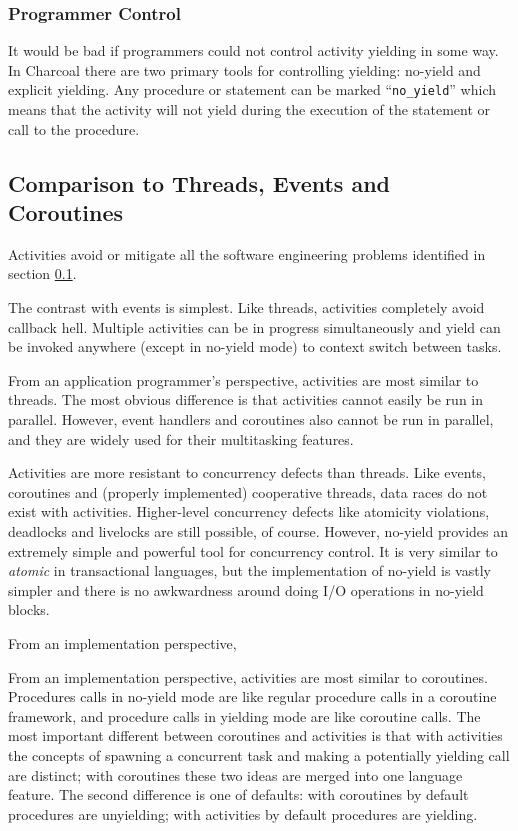 \documentclass[10pt,preprint]{sigplanconf}
\begin{document}
\subsubsection{Programmer Control}

It would be bad if programmers could not control activity yielding in some way.
In Charcoal there are two primary tools for controlling yielding: no-yield and explicit yielding.
Any procedure or statement can be marked ``\texttt{no\_yield}'' which means that the activity will not yield during the execution of the statement or call to the procedure.

\subsection{Comparison to Threads, Events and Coroutines}

Activities avoid or mitigate all the software engineering problems identified in section \ref{}.

The contrast with events is simplest.
Like threads, activities completely avoid callback hell.
Multiple activities can be in progress simultaneously and yield can be invoked anywhere (except in no-yield mode) to context switch between tasks.

From an application programmer's perspective, activities are most similar to threads.
The most obvious difference is that activities cannot easily be run in parallel.
However, event handlers and coroutines also cannot be run in parallel, and they are widely used for their multitasking features.

Activities are more resistant to concurrency defects than threads.
Like events, coroutines and (properly implemented) cooperative threads, data races do not exist with activities.
Higher-level concurrency defects like atomicity violations, deadlocks and livelocks are still possible, of course.
However, no-yield provides an extremely simple and powerful tool for concurrency control.
It is very similar to \emph{atomic} in transactional languages, but the implementation of no-yield is vastly simpler and there is no awkwardness around doing I/O operations in no-yield blocks.

From an implementation perspective, 


From an implementation perspective, activities are most similar to coroutines.
Procedures calls in no-yield mode are like regular procedure calls in a coroutine framework, and procedure calls in yielding mode are like coroutine calls.
The most important different between coroutines and activities is that with activities the concepts of spawning a concurrent task and making a potentially yielding call are distinct; with coroutines these two ideas are merged into one language feature.
The second difference is one of defaults: with coroutines by default procedures are unyielding; with activities by default procedures are yielding.
\end{document}

